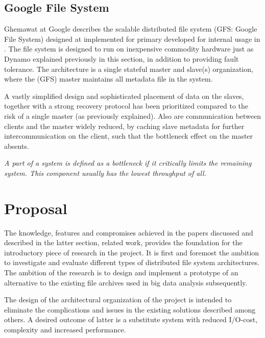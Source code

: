 \subsection*{Google File System}
Ghemawat \etal at Google describes the scalable distributed file system (GFS: Google File System) designed at implemented for primary developed for internal usage in \cite{Ghemawat:2003:GFS:945445.945450}. The file system is designed to run on inexpensive commodity hardware just as \eg Dynamo explained previously in this section, in addition to providing fault tolerance. The architecture is a single stateful master and slave(s) organization, where the (GFS) master maintains all metadata file in the system. 
\newline

A vastly simplified design and sophisticated placement of data on the slaves, together with a strong recovery protocol has been prioritized compared to the risk of a single master (as previously explained). Also are communication between clients and the master widely reduced, by caching slave metadata for further intercommunication on the client, such that the bottleneck effect on the master absents.
\vspace*{3mm}

\begin{definition} \label{def:bottle}
\textit{A part of a system is defined as a bottleneck if it critically limits the remaining system. This component usually has the lowest throughput of all.}
\end{definition}

\section{Proposal} \label{sec:proposal}
The knowledge, features and compromises achieved in the papers discussed and described in the latter section, related work, provides the foundation for the introductory piece of research in the project. It is first and foremost the ambition to investigate and evaluate different types of distributed file system architectures. The ambition of the research is to design and implement a prototype of an alternative to the existing file archives used in big data analysis subsequently.
\newline

The design of the architectural organization of the project is intended to eliminate the complications and issues in the existing solutions described among others. A desired outcome of latter is a substitute system with reduced I/O-cost, complexity and increased performance. 

